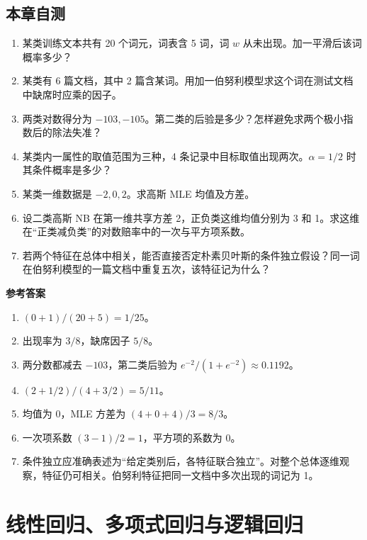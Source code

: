 \documentclass[UTF8,a4paper,zihao=-4,fontset=fandol]{ctexrep}
\begin{document}
\section{本章自测}
\begin{enumerate}
\item 某类训练文本共有 20 个词元，词表含 5 词，词 $w$ 从未出现。加一平滑后该词概率多少？
\item 某类有 6 篇文档，其中 2 篇含某词。用加一伯努利模型求这个词在测试文档中缺席时应乘的因子。
\item 两类对数得分为 $-103,-105$。第二类的后验是多少？怎样避免求两个极小指数后的除法失准？
\item 某类内一属性的取值范围为三种，4 条记录中目标取值出现两次。$\alpha=1/2$ 时其条件概率是多少？
\item 某类一维数据是 $-2,0,2$。求高斯 MLE 均值及方差。
\item 设二类高斯 NB 在第一维共享方差 2，正负类这维均值分别为 3 和 1。求这维在“正类减负类”的对数赔率中的一次与平方项系数。
\item 若两个特征在总体中相关，能否直接否定朴素贝叶斯的条件独立假设？同一词在伯努利模型的一篇文档中重复五次，该特征记为什么？
\end{enumerate}
\textbf{参考答案}
\begin{enumerate}
\item $(0+1)/(20+5)=1/25$。
\item 出现率为 $3/8$，缺席因子 $5/8$。
\item 两分数都减去 $-103$，第二类后验为 $e^{-2}/(1+e^{-2})\approx0.1192$。
\item $(2+1/2)/(4+3/2)=5/11$。
\item 均值为 0，MLE 方差为 $(4+0+4)/3=8/3$。
\item 一次项系数 $(3-1)/2=1$，平方项的系数为 0。
\item 条件独立应准确表述为“给定类别后，各特征联合独立”。对整个总体逐维观察，特征仍可相关。伯努利特征把同一文档中多次出现的词记为 1。
\end{enumerate}

\chapter{线性回归、多项式回归与逻辑回归}
\end{document}

